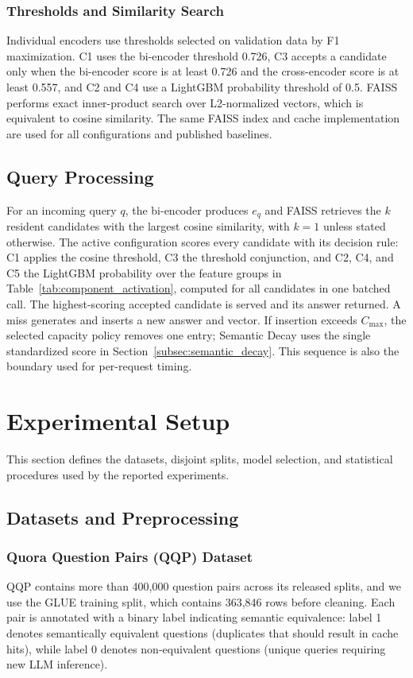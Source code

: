 \documentclass[authoryear,preprint,review,12pt]{elsarticle}
\begin{document}
\subsubsection{Thresholds and Similarity Search}
Individual encoders use thresholds selected on validation data by F1 maximization. C1 uses the bi-encoder threshold 0.726, C3 accepts a candidate only when the bi-encoder score is at least 0.726 and the cross-encoder score is at least 0.557, and C2 and C4 use a LightGBM probability threshold of 0.5. FAISS \citep{douze2024faiss} performs exact inner-product search over L2-normalized vectors, which is equivalent to cosine similarity. The same FAISS index and cache implementation are used for all configurations and published baselines.

\subsection{Query Processing}
For an incoming query $q$, the bi-encoder produces $e_q$ and FAISS retrieves the $k$ resident candidates with the largest cosine similarity, with $k=1$ unless stated otherwise. The active configuration scores every candidate with its decision rule: C1 applies the cosine threshold, C3 the threshold conjunction, and C2, C4, and C5 the LightGBM probability over the feature groups in Table~\ref{tab:component_activation}, computed for all candidates in one batched call. The highest-scoring accepted candidate is served and its answer returned. A miss generates and inserts a new answer and vector. If insertion exceeds $C_{\max}$, the selected capacity policy removes one entry; Semantic Decay uses the single standardized score in Section~\ref{subsec:semantic_decay}. This sequence is also the boundary used for per-request timing.

\section{Experimental Setup}
\label{sec:experiments}
This section defines the datasets, disjoint splits, model selection, and statistical procedures used by the reported experiments.


\subsection{Datasets and Preprocessing}
\label{subsec:datasets_preprocessing}
\subsubsection{Quora Question Pairs (QQP) Dataset}
QQP contains more than 400,000 question pairs across its released splits, and we use the GLUE training split, which contains 363,846 rows before cleaning. Each pair is annotated with a binary label indicating semantic equivalence: label 1 denotes semantically equivalent questions (duplicates that should result in cache hits), while label 0 denotes non-equivalent questions (unique queries requiring new LLM inference).
\end{document}
